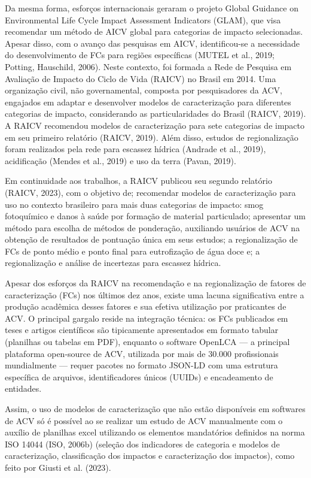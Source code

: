 Da mesma forma, esforços internacionais geraram o projeto Global Guidance on Environmental Life Cycle Impact Assessment Indicators (GLAM), que visa recomendar um método de AICV global para categorias de impacto selecionadas. Apesar disso, com o avanço das pesquisas em AICV, identificou-se a necessidade do desenvolvimento de FCs para regiões específicas (MUTEL et al., 2019; Potting, Hauschild, 2006). Neste contexto, foi formada a Rede de Pesquisa em Avaliação de Impacto do Ciclo de Vida (RAICV) no Brasil em 2014. Uma organização civil, não governamental, composta por pesquisadores da ACV, engajados em adaptar e desenvolver modelos de caracterização para diferentes categorias de impacto, considerando as particularidades do Brasil (RAICV, 2019).
A RAICV recomendou modelos de caracterização para sete categorias de impacto em seu primeiro relatório (RAICV, 2019). Além disso, estudos de regionalização foram realizados pela rede para escassez hídrica (Andrade et al., 2019), acidificação (Mendes et al., 2019) e uso da terra (Pavan, 2019).

Em continuidade aos trabalhos, a RAICV publicou seu segundo relatório (RAICV, 2023), com o objetivo de; recomendar modelos de caracterização para uso no contexto brasileiro para mais duas categorias de impacto: smog fotoquímico e danos à saúde por formação de material particulado; apresentar um método para escolha de métodos de ponderação, auxiliando usuários de ACV na obtenção de resultados de pontuação única em seus estudos; a regionalização de FCs de ponto médio e ponto final para eutrofização de água doce e; a regionalização e análise de incertezas para escassez hídrica.

Apesar dos esforços da RAICV na recomendação e na regionalização de fatores de caracterização (FCs) nos últimos dez anos, existe uma lacuna significativa entre a produção acadêmica desses fatores e sua efetiva utilização por praticantes de ACV. O principal gargalo reside na integração técnica: os FCs publicados em teses e artigos científicos são tipicamente apresentados em formato tabular (planilhas ou tabelas em PDF), enquanto o software OpenLCA — a principal plataforma open-source de ACV, utilizada por mais de 30.000 profissionais mundialmente — requer pacotes no formato JSON-LD com uma estrutura específica de arquivos, identificadores únicos (UUIDs) e encadeamento de entidades.

Assim, o uso de modelos de caracterização que não estão disponíveis em softwares de ACV só é possível ao se realizar um estudo de ACV manualmente com o auxílio de planilhas excel utilizando os elementos mandatórios definidos na norma ISO 14044 (ISO, 2006b) (seleção dos indicadores de categoria e modelos de caracterização, classificação dos impactos e caracterização dos impactos), como feito por Giusti et al. (2023).

